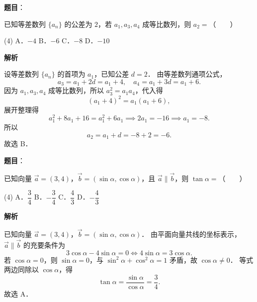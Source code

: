 \begin{answer}

\textbf{题目}：

已知等差数列 $\{a_n\}$ 的公差为 $2$，若 $a_1, a_3, a_4$ 成等比数列，则 $a_2 =$\mbox{（　　）}

\begin{gkopts}(4)
\task A．$-4$
\task B．$-6$
\task C．$-8$
\task D．$-10$
\end{gkopts}

\textbf{解析}

设等差数列 $\{a_n\}$ 的首项为 $a_1$，已知公差 $d = 2$．
由等差数列通项公式，
\nopagebreak[4]
\[
a_3 = a_1 + 2d = a_1 + 4, \quad a_4 = a_1 + 3d = a_1 + 6.
\]
因为 $a_1, a_3, a_4$ 成等比数列，所以 $a_3^2 = a_1 a_4$，代入得
\nopagebreak[4]
\[
(a_1 + 4)^2 = a_1 (a_1 + 6),
\]
展开整理得
\nopagebreak[4]
\[
a_1^2 + 8a_1 + 16 = a_1^2 + 6a_1 \implies 2a_1 = -16 \implies a_1 = -8.
\]
所以
\nopagebreak[4]
\[
a_2 = a_1 + d = -8 + 2 = -6.
\]
故选 B．


\end{answer}
\begin{answer}

\textbf{题目}：

已知向量 $\vec{a} = (3, 4)$，$\vec{b} = (\sin\alpha, \cos\alpha)$，且 $\vec{a} \parallel \vec{b}$，则 $\tan\alpha =$\mbox{（　　）}

\begin{gkopts}(4)
\task A．$\dfrac{3}{4}$
\task B．$-\dfrac{3}{4}$
\task C．$\dfrac{4}{3}$
\task D．$-\dfrac{4}{3}$
\end{gkopts}

\textbf{解析}

已知向量 $\vec{a} = (3, 4)$，$\vec{b} = (\sin\alpha, \cos\alpha)$．
由平面向量共线的坐标表示，$\vec{a} \parallel \vec{b}$ 的充要条件为
\nopagebreak[4]
\[
3\cos\alpha - 4\sin\alpha = 0 \iff 4\sin\alpha = 3\cos\alpha.
\]
若 $\cos\alpha = 0$，则 $\sin\alpha = 0$，与 $\sin^2\alpha + \cos^2\alpha = 1$ 矛盾，故 $\cos\alpha \neq 0$．
等式两边同除以 $\cos\alpha$，得
\nopagebreak[4]
\[
\tan\alpha = \frac{\sin\alpha}{\cos\alpha} = \frac{3}{4}.
\]
故选 A．


\end{answer}
